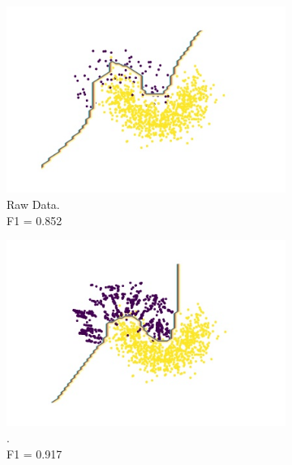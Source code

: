\begin{figure}[tp]
	\centering
	\begin{subfigure}[]{0.3\linewidth}	
		\includegraphics[width=\linewidth]{Figures/moon/RawData}
		\caption{Raw Data. \\F1 = 0.852}
		\label{fig:raw_moon}
	\end{subfigure}
	\hspace{0.1em}%
	\begin{subfigure}[]{0.3\linewidth}
		\includegraphics[width=\linewidth]{Figures/moon/SIMPOR_global1}
		\caption{\Methodname{}.\\F1 = 0.917}
		\label{fig:simpor_moon}
	\end{subfigure}
	\hspace{0.1em}%
	\begin{subfigure}[]{0.3\linewidth}

\end{subfigure}
\end{figure}
